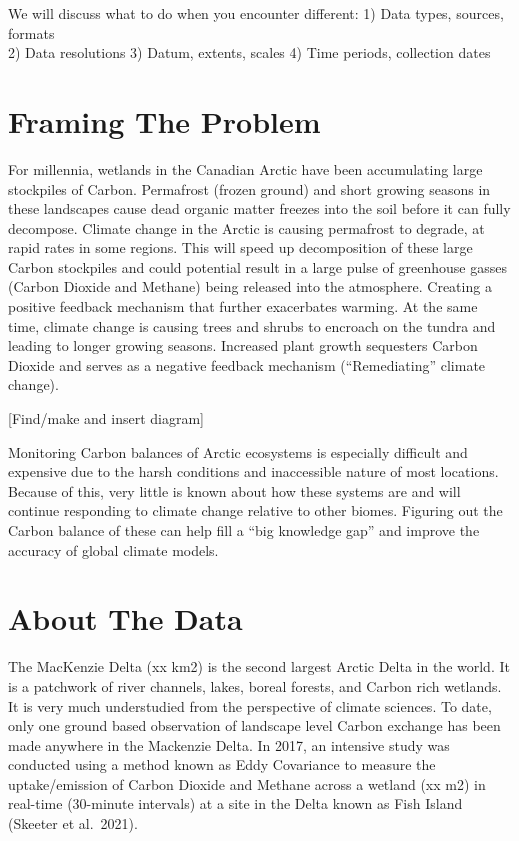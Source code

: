 \documentclass[
]{book}
\begin{document}
We will discuss what to do when you encounter different:
1) Data types, sources, formats\\
2) Data resolutions
3) Datum, extents, scales
4) Time periods, collection dates

\hypertarget{framing-the-problem}{%
\section{Framing The Problem}\label{framing-the-problem}}

For millennia, wetlands in the Canadian Arctic have been accumulating large stockpiles of Carbon. Permafrost (frozen ground) and short growing seasons in these landscapes cause dead organic matter freezes into the soil before it can fully decompose. Climate change in the Arctic is causing permafrost to degrade, at rapid rates in some regions. This will speed up decomposition of these large Carbon stockpiles and could potential result in a large pulse of greenhouse gasses (Carbon Dioxide and Methane) being released into the atmosphere. Creating a positive feedback mechanism that further exacerbates warming. At the same time, climate change is causing trees and shrubs to encroach on the tundra and leading to longer growing seasons. Increased plant growth sequesters Carbon Dioxide and serves as a negative feedback mechanism (``Remediating'' climate change).

{[}Find/make and insert diagram{]}

Monitoring Carbon balances of Arctic ecosystems is especially difficult and expensive due to the harsh conditions and inaccessible nature of most locations. Because of this, very little is known about how these systems are and will continue responding to climate change relative to other biomes. Figuring out the Carbon balance of these can help fill a ``big knowledge gap'' and improve the accuracy of global climate models.

\hypertarget{about-the-data}{%
\section{About The Data}\label{about-the-data}}

The MacKenzie Delta (xx km2) is the second largest Arctic Delta in the world. It is a patchwork of river channels, lakes, boreal forests, and Carbon rich wetlands. It is very much understudied from the perspective of climate sciences. To date, only one ground based observation of landscape level Carbon exchange has been made anywhere in the Mackenzie Delta. In 2017, an intensive study was conducted using a method known as Eddy Covariance to measure the uptake/emission of Carbon Dioxide and Methane across a wetland (xx m2) in real-time (30-minute intervals) at a site in the Delta known as Fish Island (Skeeter et al.~2021).
\end{document}
